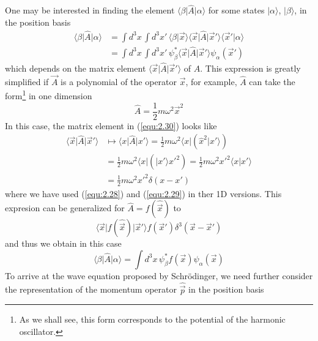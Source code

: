 One may be interested in finding the element
$\langle \beta\vert \hat{A}\vert \alpha\rangle $ for some states $\vert \alpha\rangle $,
$\vert \beta\rangle $, in the position basis
\begin{align}
  \langle \beta\vert \hat{A}\vert \alpha\rangle  &= \int d^3 x\, \int d^3 x'\,
  \langle \beta\vert \vec{x}\rangle \langle \vec{x}\vert \hat{A}\vert \vec{x}'\rangle \langle \vec{x}'\vert \alpha\rangle \nonumber\\
  &=\int d^3 x\, \int d^3 x'\,
  \psi_{\beta}^* \langle \vec{x}\vert \hat{A}\vert \vec{x}'\rangle 
  \psi_{\alpha}(\vec{x}')
  \label{equ:2.30}
\end{align}
which depends on the matrix element
$\langle \vec{x}\vert \hat{A}\vert \vec{x}'\rangle $ of $\hat{A}$. This expression
is greatly simplified if $\vec{A}$ is a polynomial of the
operator $\vec{x}$, for example, $\hat{A}$ can take the
form\footnote{As we shall see, this form corresponds to the
potential of the harmonic oscillator.}
in one dimension
\begin{equation}
  \hat{A} = \frac{1}{2} m \omega^2 \vec{x}^2
  \label{equ:2.31}
\end{equation}
In this case, the matrix element in (\ref{equ:2.30}) looks
like
\begin{align*}
  \langle \vec{x}\vert \hat{A}\vert \vec{x}'\rangle  &\mapsto \langle x\vert \hat{A}\vert x'\rangle  =
  \frac{1}{2} m \omega^2 \langle x\vert (\hat{x}^2\vert x'\rangle ) \\
  &=
  \frac{1}{2}m\omega^2 \langle x\vert (\vert x'\rangle x'^2) = \frac{1}{2}m\omega^2
  x'^2\langle x\vert x'\rangle \\
  &=
  \frac{1}{2}m\omega^2 x'^2 \delta(x-x')
\end{align*}
where we have used (\ref{equ:2.28}) and (\ref{equ:2.29}) in
ther 1D versions. This expresion can be generalized for
$\hat{A} = f(\hat{\vec{x}})$ to
\begin{equation}
  \langle \vec{x}\vert f(\hat{\vec{x}})\vert \vec{x}'\rangle  f(\vec{x}')\delta^3
  (\vec{x}-\vec{x}')
  \label{equ:2.33}
\end{equation}
and thus we obtain in this case
\begin{equation}
  \langle \beta\vert \hat{A}\vert \alpha\rangle  = \int d^3x \, \psi_{\beta}^*
  f(\vec{x}) \psi_{\alpha}(\vec{x})
  \label{equ:2.34}
\end{equation}
To arrive at the wave equation proposed by Schrödinger, we
need further consider the representation of the momentum
operator $\hat{\vec{p}}$ in the position basis
